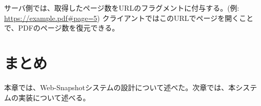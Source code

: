 サーバ側では、取得したページ数をURLのフラグメントに付与する。(例: \url{https://example.pdf#page=5})
クライアントではこのURLでページを開くことで、PDFのページ数を復元できる。

\section{まとめ}
本章では、Web-Snapshotシステムの設計について述べた。次章では、本システムの実装について述べる。
